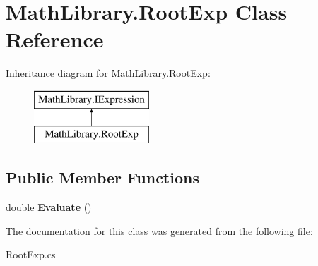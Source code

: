 \hypertarget{class_math_library_1_1_root_exp}{}\section{Math\+Library.\+Root\+Exp Class Reference}
\label{class_math_library_1_1_root_exp}
Inheritance diagram for Math\+Library.\+Root\+Exp\+:\begin{figure}[H]
\begin{center}
\leavevmode
\includegraphics[height=2.000000cm]{class_math_library_1_1_root_exp}
\end{center}
\end{figure}
\subsection*{Public Member Functions}
\begin{DoxyCompactItemize}
\item 
\mbox{\label{class_math_library_1_1_root_exp_ad1497dbdd4f9706b71856cb9795072a0}} 
double {\bfseries Evaluate} ()
\end{DoxyCompactItemize}


The documentation for this class was generated from the following file\+:\begin{DoxyCompactItemize}
\item 
Root\+Exp.\+cs\end{DoxyCompactItemize}
